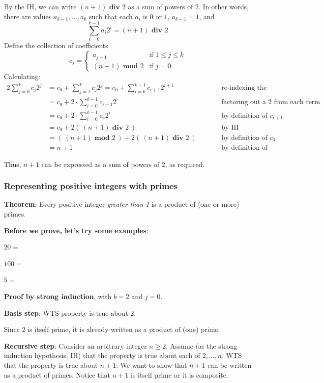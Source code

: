 \documentclass[12pt, oneside]{article}
\begin{document}
By the IH, we can write $(n+1) \textbf{ div } 2$ as 
a sum of powers of $2$. In other words, 
there are values $a_{k-1}, \ldots, a_0$ such that each $a_i$ is $0$ or $1$, $a_{k-1} = 1$, 
and
\[
    \sum_{i=0}^{k-1} a_i 2^i = (n+1) \textbf{ div } 2   
\]
Define the collection of coefficients
\[
   c_{j} = 
   \begin{cases}
        a_{j-1} \qquad&\text{if $1 \leq j \leq k$}\\
        (n+1) \textbf{ mod } 2 &\text{if $j = 0$}
   \end{cases}
\]
Calculating: 
\begin{alignat*}{2}
    \sum_{j=0}^k c_j 2^j &= c_0 + \sum_{j=1}^k c_j 2^j 
    = c_0 + \sum_{i=0}^{k-1} c_{i+1} 2^{i+1} &\qquad &\text{re-indexing the summation}\\
    &= c_0 + 2 \cdot \sum_{i=0}^{k-1} c_{i+1}2^i &\qquad &\text{factoring out a $2$ from each term in the sum}\\
    &= c_0 + 2 \cdot \sum_{i=0}^{k-1} a_{i} 2^i &\qquad &\text{by definition of $c_{i+1}$}\\
    &= c_0 + 2 \left(~(n+1) \textbf{ div } 2 ~\right) &\qquad &\text{by IH} \\
    &= \left(~ (n+1) \textbf{ mod } 2 ~\right ) + 2 \left(~(n+1) \textbf{ div } 2 ~\right) &\qquad &\text{by definition of $c_0$} \\
    &= n+1 &\qquad&\text{by definition of long division}
\end{alignat*}

Thus, $n+1$ can be expressed as a sum of powers of $2$, as required. \newpage
\subsubsection*{Representing positive integers with primes}


{\bf Theorem}: Every positive integer {\it greater than 1} is a product of (one or more) primes.

{\bf Before we prove, let's try some examples}:

$20 = $

$100 = $

$5 = $


{\bf Proof by strong induction}, with $b=2$ and $j=0$.

{\bf Basis step}:  WTS property is true about  $2$.

Since $2$ is itself prime,
it is already written as a product of (one) prime.


{\bf Recursive step}: Consider an arbitrary integer $n \geq 2$.
Assume (as the strong induction hypothesis, IH) that the property is true about  each of $2, \ldots, n$.  
WTS that the property is true about  $n+1$: We want to show that $n+1$ can be written 
as a product of primes.  Notice that $n+1$ is itself prime or it is composite.
\end{document}
